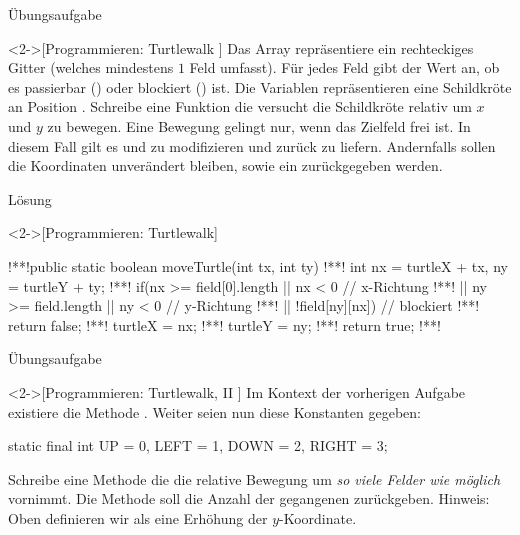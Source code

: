 \begin{frame}[c]{Übungsaufgabe}
    \begin{exercise}<2->[Programmieren: Turtlewalk ]
        \pause{}Das Array  repräsentiere ein rechteckiges Gitter (welches mindestens \(1\) Feld umfasst).\pause{} Für jedes Feld  gibt der Wert an, ob es passierbar () oder blockiert () ist.\pause{} Die Variablen \pause{} repräsentieren eine Schildkröte an Position .
        \pause{}Schreibe eine Funktion  die versucht die Schildkröte relativ um \(x\) und \(y\) zu bewegen.\pause{} Eine Bewegung gelingt nur, wenn das Zielfeld frei ist.\pause{} In diesem Fall gilt es  und  zu modifizieren und  zurück zu liefern.\pause{} Andernfalls sollen die Koordinaten unverändert bleiben, sowie ein  zurückgegeben werden.
    \end{exercise}
\end{frame}

\begin{frame}[c,fragile]{Lösung}
    \begin{solve}<2->[Programmieren: Turtlewalk]
        \begin{plainjava}
!**!public static boolean moveTurtle(int tx, int ty){
!**!    int nx = turtleX + tx, ny = turtleY + ty;
!**!    if(nx >= field[0].length || nx < 0 // x-Richtung
!**!       || ny >= field.length || ny < 0 // y-Richtung
!**!       || !field[ny][nx]) // blockiert
!**!            return false;
!**!    turtleX = nx;
!**!    turtleY = ny;
!**!    return true;
!**!}
        \end{plainjava}
    \end{solve}
\end{frame}

\begin{frame}[c,fragile]{Übungsaufgabe}
    \begin{exercise}<2->[Programmieren: Turtlewalk, II ]
        \pause{}Im Kontext der vorherigen Aufgabe existiere die Methode .\pause{} Weiter seien nun diese Konstanten gegeben:\pause{}
\begin{plainjava}
static final int UP = 0, LEFT = 1, DOWN = 2, RIGHT = 3;
\end{plainjava}
    \pause{}Schreibe eine Methode  die die relative Bewegung um \emph{so viele Felder wie möglich} vornimmt.\pause{} Die Methode soll die Anzahl der gegangenen zurückgeben.\pause{} Hinweis: Oben definieren wir als eine Erhöhung der \(y\)-Koordinate.
    \end{exercise}
\end{frame}

